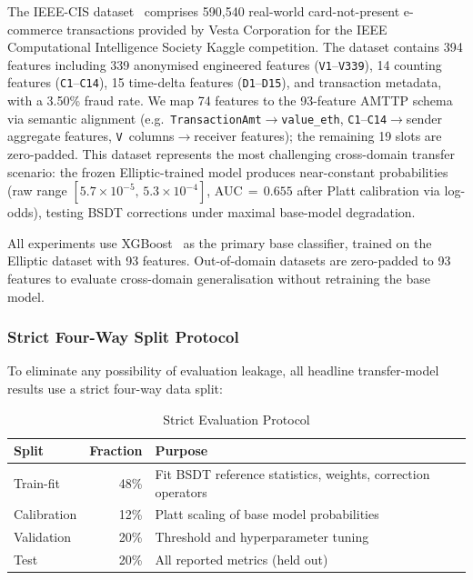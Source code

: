 \documentclass[journal]{IEEEtran}
\begin{document}
The IEEE-CIS dataset~\cite{ieee_cis_2019} comprises 590{,}540 real-world card-not-present e-commerce transactions provided by Vesta Corporation for the IEEE Computational Intelligence Society Kaggle competition. The dataset contains 394 features including 339 anonymised engineered features (\texttt{V1}--\texttt{V339}), 14 counting features (\texttt{C1}--\texttt{C14}), 15 time-delta features (\texttt{D1}--\texttt{D15}), and transaction metadata, with a 3.50\% fraud rate. We map 74 features to the 93-feature AMTTP schema via semantic alignment (e.g.~\texttt{TransactionAmt}$\to$\texttt{value\_eth}, \texttt{C1}--\texttt{C14}$\to$sender aggregate features, \texttt{V}~columns$\to$receiver features); the remaining 19 slots are zero-padded. This dataset represents the most challenging cross-domain transfer scenario: the frozen Elliptic-trained model produces near-constant probabilities (raw range $[5.7{\times}10^{-5},\, 5.3{\times}10^{-4}]$, AUC$\,{=}\,0.655$ after Platt calibration via log-odds), testing BSDT corrections under maximal base-model degradation.

All experiments use XGBoost~\cite{chen2016xgboost} as the primary base classifier, trained on the Elliptic dataset with 93 features. Out-of-domain datasets are zero-padded to 93 features to evaluate cross-domain generalisation without retraining the base model.

\subsubsection{Strict Four-Way Split Protocol}
\label{sssec:strict}

To eliminate any possibility of evaluation leakage, all headline transfer-model results use a strict four-way data split:

\begin{table}[!t]
\centering
\caption{Strict Evaluation Protocol}
\label{tab:protocol}
\begin{tabular}{@{}lrl@{}}
\toprule
\textbf{Split} & \textbf{Fraction} & \textbf{Purpose} \\
\midrule
Train-fit     & 48\% & Fit BSDT reference statistics, weights, correction operators \\
Calibration   & 12\% & Platt scaling of base model probabilities \\
Validation    & 20\% & Threshold and hyperparameter tuning \\
Test          & 20\% & All reported metrics (held out) \\
\bottomrule
\end{tabular}
\end{table}
\end{document}
